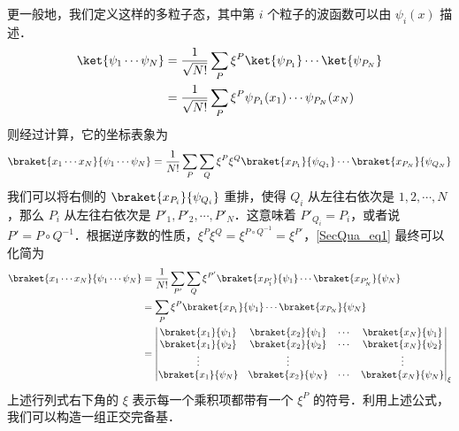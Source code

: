 更一般地，我们定义这样的多粒子态，其中第 $i$ 个粒子的波函数可以由 $\psi_i(x)$ 描述．
\begin{equation}
\begin{aligned}
\ket{\psi_1\cdots\psi_N}&=\frac{1}{\sqrt{N!}}\sum_P \xi^P\ket{\psi_{P_1}}\cdots \ket{\psi_{P_N}}\\
&=\frac{1}{\sqrt{N!}}\sum_P \xi^P\psi_{P_1}(x_1)\cdots \psi_{P_N}(x_N)
\end{aligned}
\end{equation}
则经过计算，它的坐标表象为
\begin{equation}\label{SecQua_eq1}
\braket{x_1\cdots x_N}{\psi_1\cdots\psi_N}=\frac{1}{N!}\sum_P\sum_Q \xi^P \xi^Q \braket{x_{P_1}}{\psi_{Q_1}}\cdots\braket{x_{P_N}}{\psi_{Q_N}}
\end{equation}
我们可以将右侧的 $\braket{x_{P_i}}{\psi_{Q_i}}$ 重排，使得 $Q_i$ 从左往右依次是 $1,2,\cdots,N$，那么 $P_i$ 从左往右依次是 $P'_1,P'_2,\cdots,P'_N$．这意味着 $P'_{Q_i}=P_i$，或者说 $P'=P\circ Q^{-1}$．根据逆序数的性质，$\xi^P\xi^Q=\xi^{P\circ Q^{-1}}=\xi^{P'}$，\autoref{SecQua_eq1}  最终可以化简为
\begin{equation}
\begin{aligned}
\braket{x_1\cdots x_N}{\psi_1\cdots\psi_N}&=\frac{1}{N!}\sum_{P'}\sum_Q \xi^{P'} \braket{x_{P'_1}}{\psi_{1}}\cdots\braket{x_{P'_N}}{\psi_{N}}\\
&=\sum_{P}\xi^P\braket{x_{P_1}}{\psi_{1}}\cdots\braket{x_{P_N}}{\psi_{N}}\\
&=\left|\begin{matrix}
\braket{x_1}{\psi_1} &\braket{x_2}{\psi_1} &\cdots &\braket{x_N}{\psi_1}\\
\braket{x_1}{\psi_2} &\braket{x_2}{\psi_2} &\cdots & \braket{x_N}{\psi_2}\\
\vdots & \vdots & & \vdots \\
\braket{x_1}{\psi_N} &\braket{x_2}{\psi_N} &\cdots & \braket{x_N}{\psi_N}
\end{matrix}\right|_\xi
\end{aligned}
\end{equation}
上述行列式右下角的 $\xi$ 表示每一个乘积项都带有一个 $\xi^P$ 的符号．利用上述公式，我们可以构造一组正交完备基．

